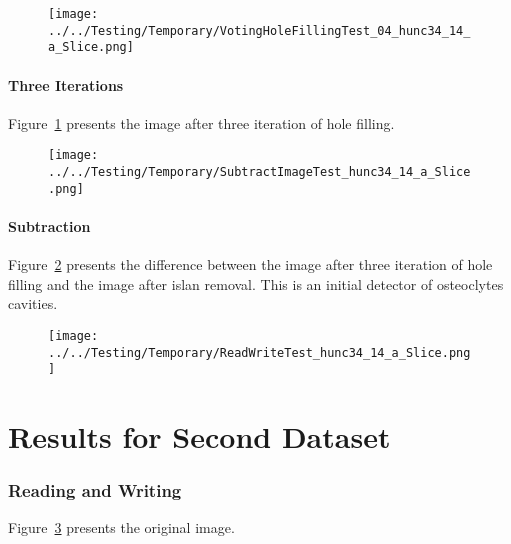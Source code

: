 \documentclass{InsightArticle}
\begin{document}
\clearpage
\begin{figure}
\center
\texttt{[image: ../../Testing/Temporary/VotingHoleFillingTest\_04\_hunc34\_14\_a\_Slice.png]}
\label{fig:HoleFillingIteration03Image}
\end{figure}


\subsection{Three Iterations}

Figure~\ref{fig:HoleFillingIteration03Image} presents the image after three iteration of hole filling.



\clearpage
\begin{figure}
\center
\texttt{[image: ../../Testing/Temporary/SubtractImageTest\_hunc34\_14\_a\_Slice.png]}
\label{fig:SubtractionImage}
\end{figure}

\subsection{Subtraction}

Figure~\ref{fig:SubtractionImage} presents the difference between the image
after three iteration of hole filling and the image after islan removal. This
is an initial detector of osteoclytes cavities.


\clearpage
\begin{figure}
\center
\texttt{[image: ../../Testing/Temporary/ReadWriteTest\_hunc34\_14\_a\_Slice.png]}
\label{fig:OriginalImage2}
\end{figure}

\part{Results for Second Dataset}

\section{Reading and Writing}

Figure~\ref{fig:OriginalImage2} presents the original image.
\end{document}
